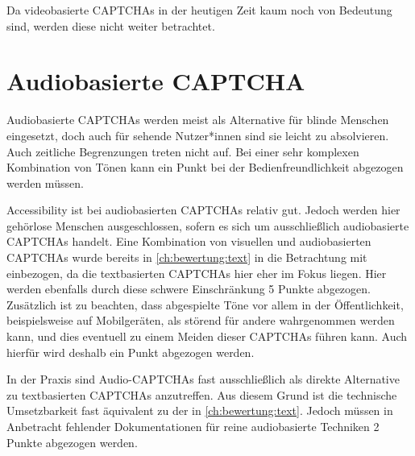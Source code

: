 Da videobasierte CAPTCHAs in der heutigen Zeit kaum noch von Bedeutung sind, werden diese nicht weiter betrachtet.

\section{Audiobasierte CAPTCHA}
\label{ch:bewertung:audio}
Audiobasierte CAPTCHAs werden meist als Alternative für blinde Menschen eingesetzt, 
doch auch für sehende Nutzer*innen sind sie leicht zu absolvieren.
Auch zeitliche Begrenzungen treten nicht auf.
Bei einer sehr komplexen Kombination von Tönen kann ein Punkt bei der Bedienfreundlichkeit abgezogen werden müssen.

 \pagebreak

Accessibility ist bei audiobasierten CAPTCHAs relativ gut. 
Jedoch werden hier gehörlose Menschen ausgeschlossen, sofern es sich um ausschließlich audiobasierte CAPTCHAs handelt.
Eine Kombination von visuellen und audiobasierten CAPTCHAs wurde bereits in \autoref{ch:bewertung:text} in die Betrachtung mit einbezogen,
da die textbasierten CAPTCHAs hier eher im Fokus liegen.
Hier werden ebenfalls durch diese schwere Einschränkung 5 Punkte abgezogen.
Zusätzlich ist zu beachten, dass abgespielte Töne vor allem in der Öffentlichkeit, beispielsweise auf Mobilgeräten, als störend für andere wahrgenommen werden kann,
und dies eventuell zu einem Meiden dieser CAPTCHAs führen kann.
Auch hierfür wird deshalb ein Punkt abgezogen werden. 

In der Praxis sind Audio-CAPTCHAs fast ausschließlich als direkte Alternative zu textbasierten CAPTCHAs anzutreffen.
Aus diesem Grund ist die technische Umsetzbarkeit fast äquivalent zu der in \autoref{ch:bewertung:text}.
Jedoch müssen in Anbetracht fehlender Dokumentationen für reine audiobasierte Techniken 2 Punkte abgezogen werden.

